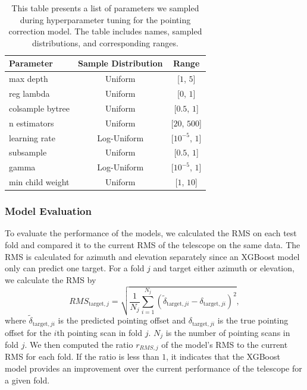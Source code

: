 \begin{table}[H]
    \centering
    \caption{This table presents a list of parameters we sampled during hyperparameter tuning for the pointing correction model. The table includes names, sampled distributions, and corresponding ranges.}
    \begin{tabular}{lcc}
        \toprule
        \textbf{Parameter} & \textbf{Sample Distribution} & \textbf{Range} \\ \hline
        max depth & Uniform & [$1$, $5$] \\ 
        reg lambda & Uniform & [$0$, $1$] \\ 
        colsample bytree & Uniform & [$0.5$, $1$] \\ 
        n estimators & Uniform & [$20$, $500$] \\ 
        learning rate & Log-Uniform & [$10^{-5}$, $1$] \\ 
        subsample & Uniform & [$0.5$, $1$] \\ 
        gamma & Log-Uniform & [$10^{-5}$, $1$] \\ 
        min child weight & Uniform & [$1$, $10$] \\ 
        \bottomrule
    \end{tabular}
    \label{tab:xgb_hyperparameters_pcorr}
\end{table}



\subsubsection{Model Evaluation}
To evaluate the performance of the models, we calculated the RMS on each test fold and compared it to the current RMS of the telescope on the same data.
The RMS is calculated for azimuth and elevation separately since an XGBoost model only can predict one target.
For a fold $j$ and target either azimuth or elevation, we calculate the RMS by
\begin{equation}
    RMS_{\text{target},j} = \sqrt{\frac{1}{N_j}\sum_{i=1}^{N_j} (\tilde{\delta}_{\text{target},ji} - \delta_{\text{target},ji})^2},
\end{equation}
where $\tilde{\delta}_{\text{target},ji}$ is the predicted pointing offset and $\delta_{\text{target},ji}$ is the true pointing offset for the $i$th pointing scan in fold $j$.
$N_j$ is the number of pointing scans in fold $j$. 
We then computed the ratio $r_{RMS,j}$ of the model's RMS to the current RMS for each fold.
If the ratio is less than $1$, it indicates that the XGBoost model provides an improvement over the current performance of the telescope for a given fold.

